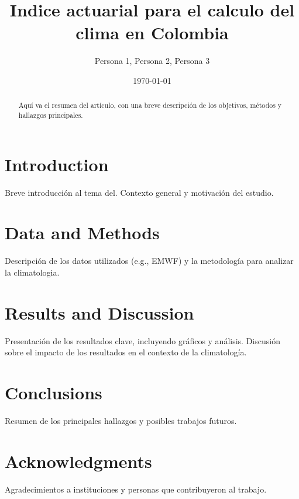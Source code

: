 \documentclass[a4paper,12pt]{article}
\title{Indice actuarial para el calculo del clima en Colombia}
\author{Persona 1, Persona 2, Persona 3}
\date{\today}
\begin{document}
\maketitle

\begin{abstract}
Aquí va el resumen del artículo, con una breve descripción de los objetivos, métodos y hallazgos principales.
\end{abstract}

\section{Introduction}
Breve introducción al tema del. Contexto general y motivación del estudio.

\section{Data and Methods}
Descripción de los datos utilizados (e.g., EMWF) y la metodología para analizar la climatologia.

\section{Results and Discussion}
Presentación de los resultados clave, incluyendo gráficos y análisis. Discusión sobre el impacto de los resultados en el contexto de la climatología.

\section{Conclusions}
Resumen de los principales hallazgos y posibles trabajos futuros.

\section*{Acknowledgments}
Agradecimientos a instituciones y personas que contribuyeron al trabajo.

\end{document}
